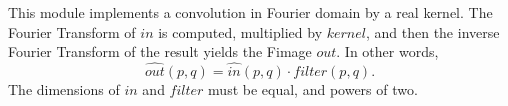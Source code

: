 This module implements a convolution in Fourier domain by
a real kernel. The Fourier Transform of $in$ is computed,
multiplied by $kernel$, and then the inverse Fourier Transform
of the result yields the Fimage $out$. In other words,
$$\widehat{out}(p,q) = \widehat{in}(p,q) \cdot filter(p,q).$$
The dimensions of $in$ and $filter$ must be equal, and powers
of two.
